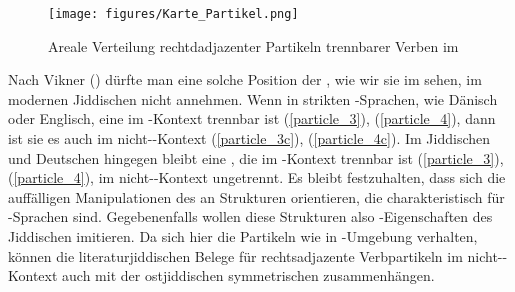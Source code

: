 \begin{figure}
\centering
\texttt{[image: figures/Karte\_Partikel.png]}
		\caption{\label{KarteVerbpartikel} Areale Verteilung rechtdadjazenter Partikeln trennbarer Verben im }
	\end{figure}

Nach Vikner (\citeyear[36]{Vikner2001}) dürfte man eine solche Position der , wie wir sie im \hai{{\LiJi}} sehen, im modernen Jiddischen nicht annehmen. Wenn in strikten \hai{{\VO}}-Sprachen, wie Dänisch oder Englisch, eine  im -Kontext trennbar ist (\ref{particle_3}), (\ref{particle_4}), dann ist sie es auch im nicht--Kontext (\ref{particle_3c}), (\ref{particle_4c}). Im Jiddischen und Deutschen hingegen bleibt eine , die im -Kontext trennbar ist (\ref{particle_3}), (\ref{particle_4}), im nicht--Kontext ungetrennt. %
Es bleibt festzuhalten, dass sich die auffälligen Manipulationen des \hai{{\LiJi}} an Strukturen orientieren, die charakteristisch für  \hai{{\VO}}-Sprachen sind. Gegebenenfalls wollen diese Strukturen also \hai{{\VO}}-Eigenschaften des Jiddischen imitieren. Da sich hier die Partikeln wie in -Umgebung verhalten, können die literaturjiddischen Belege für rechtsadjazente Verbpartikeln im nicht--Kontext auch mit der  ostjiddischen symmetrischen  zusammenhängen. 


   
